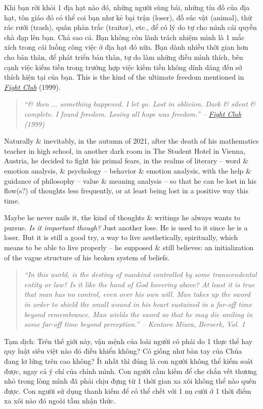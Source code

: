 \documentclass[12pt]{article}
\begin{document}
Khi bạn rời khỏi 1 địa hạt nào đó, những người sùng bái, những tín đồ của địa hạt, tôn giáo đó có thể coi bạn như kẻ bại trận (loser), đồ súc vật (animal), thứ rác rưởi (trash), quân phản trắc (traitor), etc., để có lý do tự cho mình cái quyền chà đạp lên bạn. Chả sao cả. Bạn không còn lãnh trách nhiệm mình là 1 mắc xích trong cái luồng công việc ở địa hạt đó nữa. Bạn dành nhiều thời gian hơn cho bản thân, để phát triển bản thân, tự do làm những điều mình thích, bên cạnh việc kiếm tiền trong trường hợp việc kiếm tiền không dính dáng đến sở thích hiện tại của bạn. This is the kind of the ultimate freedom mentioned in \href{https://www.imdb.com/title/tt0137523}{\it Fight Club} (1999).
\begin{quote}\it
	``\& then $\ldots$ something happened. I let go. Lost in oblivion. Dark \& silent \& complete. I found freedom. Losing all hope was freedom.'' -- \href{https://www.imdb.com/title/tt0137523}{\it Fight Club} (1999)
\end{quote}
Naturally \& inevitably, in the autumn of 2021, after the death of his mathematics teacher in high school, in another dark room in The Student Hotel in Vienna, Austria, he decided to fight his primal fears, in the realms of literary -- word \& emotion analysis, \& psychology -- behavior \& emotion analysis, with the help \& guidance of philosophy -- value \& meaning analysis -- so that he can be lost in his flow(s?) of thoughts less frequently, or at least being lost in a positive way this time.

Maybe he never nails it, the kind of thoughts \& writings he always wants to pursue. {\it Is it important though?} Just another lose. He is used to it since he is a loser. But it is still a good try, a way to live aesthetically, spiritually, which means to be able to live properly -- he supposed \& still believes: an initialization of the vague structure of his broken system of beliefs.

\begin{quotation}\it
	``In this world, is the destiny of mankind controlled by some transcendental entity or law? Is it like the hand of God hovering above? At least it is true that man has no control, even over his own will. Man takes up the sword in order to shield the small wound in his heart sustained in a far-off time beyond remembrance. Man wields the sword so that he may die smiling in some far-off time beyond perception.'' -- {\sc Kentaro Miura}, {\it Berserk}, Vol. 1
\end{quotation}
{\sf Tạm dịch}: Trên thế giới này, vận mệnh của loài người có phải do 1 thực thể hay quy luật siêu việt nào đó điều khiển không? Có giống như bàn tay của Chúa đang lơ lửng trên cao không? Ít nhất thì đúng là con người không thể kiểm soát được, ngay cả ý chí của chính mình. Con người cầm kiếm để che chắn vết thương nhỏ trong lòng mình đã phải chịu đựng từ 1 thời gian xa xôi không thể nào quên được. Con người sử dụng thanh kiếm để có thể chết với 1 nụ cười ở 1 thời điểm xa xôi nào đó ngoài tầm nhận thức.
\end{document}

